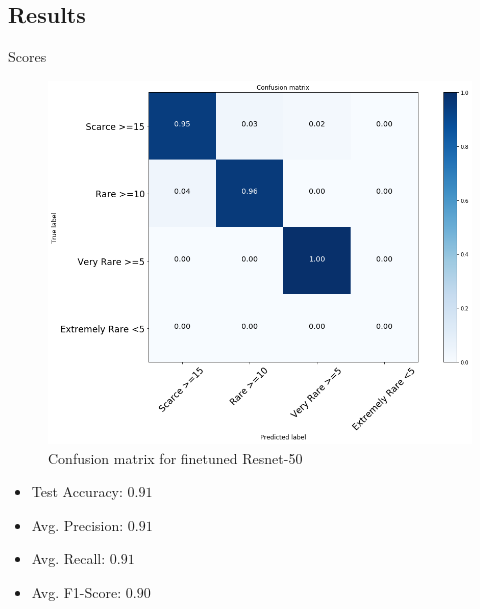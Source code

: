 \documentclass[10pt]{beamer}
\begin{document}
\subsection{Results}

\begin{frame}{Scores}
	\centering
	\begin{minipage}[c]{0.58\linewidth}
		\begin{figure}
			\includegraphics[width=\columnwidth]{images/conf_mat_leo_v2.png}
			\caption{Confusion matrix for finetuned Resnet-50}
		\end{figure}
	\end{minipage}
	\begin{minipage}[c]{0.38\linewidth}
		\begin{itemize}
			\item Test Accuracy: $0.91$
			\item Avg. Precision: $0.91$      
			\item Avg. Recall: $0.91$
			\item Avg. F1-Score: $0.90$
		\end{itemize}
	\end{minipage}
\end{frame}
\end{document}
